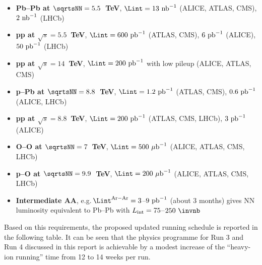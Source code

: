 \documentclass[../report.tex]{subfiles}
\begin{document}
\begin{itemize}

\item {\bf Pb--Pb at $\sqrtsNN=5.5$~TeV}, $\Lint=13~{\rm nb}^{-1}$ (ALICE, ATLAS, CMS), $2~{\rm nb}^{-1}$ (LHCb)

\item {\bf pp at $\sqrt s=5.5$~TeV}, $\Lint=600~{\rm pb}^{-1}$ (ATLAS, CMS), $6~{\rm pb}^{-1}$ (ALICE),  $50~{\rm pb}^{-1}$ (LHCb) 

\item {\bf pp at $\sqrt s=14$~TeV}, $\Lint=200~{\rm pb}^{-1}$ with low pileup (ALICE, ATLAS, CMS)

\item {\bf p--Pb at $\sqrtsNN=8.8$~TeV}, $\Lint=1.2~{\rm pb}^{-1}$ (ATLAS, CMS), $0.6~{\rm pb}^{-1}$ (ALICE, LHCb) 

\item {\bf pp at $\sqrt s=8.8$~TeV}, $\Lint=200~{\rm pb}^{-1}$ (ATLAS, CMS, LHCb), $3~{\rm pb}^{-1}$ (ALICE)

\item {\bf O--O at $\sqrtsNN=7$~TeV}, $\Lint=500~{\rm \mu b}^{-1}$ (ALICE, ATLAS, CMS, LHCb)

\item {\bf p--O at $\sqrtsNN=9.9$~TeV}, $\Lint=200~{\rm \mu b}^{-1}$ (ALICE, ATLAS, CMS, LHCb)

\item {\bf Intermediate AA}, e.g.\,$\Lint^{\rm Ar-Ar}=3$--$9~{\rm pb}^{-1}$ (about 3 months) gives NN luminosity equivalent to Pb--Pb with $L_{\rm int} =75$--$250~\invnb$

\end{itemize}

Based on this requirements, the proposed updated running schedule is reported in the following table. It can be seen that the physics programme for Run 3 and Run 4 discussed in this report is achievable by a modest increase of the ``heavy-ion running'' time from 12 to 14 weeks per run.
\end{document}
